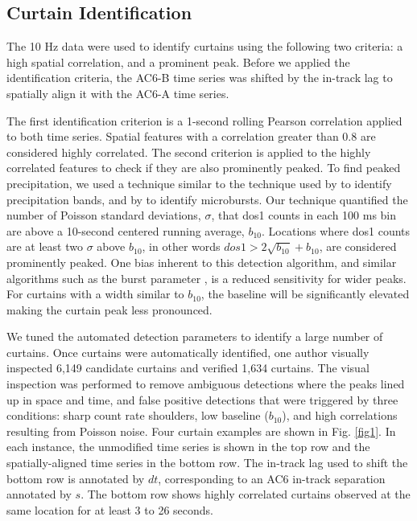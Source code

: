 \documentclass[draft]{agujournal2019}
\begin{document}
\subsection{Curtain Identification} \label{curtain_identification}
The 10 Hz data were used to identify curtains using the following two criteria: a high spatial correlation, and a prominent peak. Before we applied the identification criteria, the AC6-B time series was shifted by the in-track lag to spatially align it with the AC6-A time series. 

The first identification criterion is a 1-second rolling Pearson correlation applied to both time series. Spatial features with a correlation greater than 0.8 are considered highly correlated. The second criterion is applied to the highly correlated features to check if they are also prominently peaked. To find peaked precipitation, we used a technique similar to the technique used by  to identify precipitation bands, and by  to identify microbursts. Our technique quantified the number of Poisson standard deviations, $\sigma$, that dos1 counts in each 100 ms bin are above a 10-second centered running average, $b_{10}$. Locations where dos1 counts are at least two $\sigma$ above $b_{10}$, in other words $dos1 > 2\sqrt{b_{10}} + b_{10}$, are considered prominently peaked. One bias inherent to this detection algorithm, and similar algorithms such as the burst parameter \cite{O'Brien2003}, is a reduced sensitivity for wider peaks. For curtains with a width similar to $b_{10}$, the baseline will be significantly elevated making the curtain peak less pronounced.

We tuned the automated detection parameters to identify a large number of curtains. Once curtains were automatically identified, one author visually inspected 6,149 candidate curtains and verified 1,634 curtains. The visual inspection was performed to remove ambiguous detections where the peaks lined up in space and time, and false positive detections that were triggered by three conditions: sharp count rate shoulders, low baseline ($b_{10}$), and high correlations resulting from Poisson noise. Four curtain examples are shown in Fig. \ref{fig1}. In each instance, the unmodified time series is shown in the top row and the spatially-aligned time series in the bottom row. The in-track lag used to shift the bottom row is annotated by $dt$, corresponding to an AC6 in-track separation annotated by $s$. The bottom row shows highly correlated curtains observed at the same location for at least 3 to 26 seconds.
\end{document}
